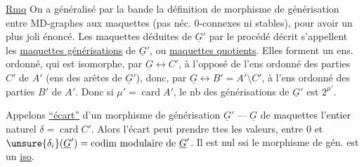 \uline{Rmq} On a généralisé par la bande la définition de morphisme de générisation entre MD-graphes aux maquettes (pas néc. $0$-connexes ni stables), pour avoir un plus joli énoncé. Les maquettes déduites de $\underline{G}'$ par le procédé décrit s'appellent les \uline{maquettes générisations} de $\underline{G}'$, ou \uline{maquettes quotients}. Elles forment un ens. ordonné, qui est isomorphe, par $\underline{G}\longleftrightarrow C'$, à l'opposé de l'ens ordonné des parties $C'$ de $A'$ (ens des arêtes de $\underline{G}'$), donc, par $\underline{G}\longleftrightarrow B'=A'\setminus C'$, à l'ens ordonné des parties $B'$ de $A'$. Donc si $\mu'=\operatorname{card}A'$, le nb des générisations de $\underline{G}'$ est $2^{\mu'}$.

Appelons \uline{``écart''} d'un morphisme de générisation $\underline{G}'\mathbin{\text{---}}\underline{G}$ de maquettes l'entier naturel $\delta=\operatorname{card}C'$. Alors l'écart     peut prendre ttes les valeurs, entre $0$ et $\unsure{\delta_i}(\underline{G}')=\text{codim modulaire de }\underline{G}'$. Il est nul ssi le morphisme de gén. est un \uline{iso}.
